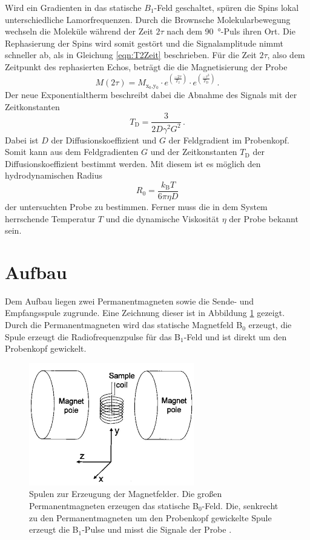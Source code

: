 Wird ein Gradienten in das statische $B_1$-Feld geschaltet, spüren die Spins lokal unterschiedliche Lamorfrequenzen.
Durch die Brownsche Molekularbewegung wechseln die Moleküle während der Zeit $2\tau$ nach dem \SI{90}{\degree}-Puls ihren Ort.
Die Rephasierung der Spins wird somit gestört und die Signalamplitude nimmt schneller ab, als in Gleichung \eqref{eqn:T2Zeit} beschrieben.
Für die Zeit $2\tau$, also dem Zeitpunkt des rephasierten Echos, beträgt die die Magnetisierung der Probe
\begin{equation}
  M(2\tau) = M_\text{x$_0$,y$_0$} \cdot e^{(\frac{-2\tau}{T_2})} \cdot e^{(\frac{-\tau^3}{T_\text{D}})} \, .
  \label{eqn:Diffusion}
\end{equation}
Der neue Exponentialtherm beschreibt dabei die Abnahme des Signals mit der Zeitkonstanten
\begin{equation}
  T_\text{D} = \frac{3}{2D \gamma^2 G^2}\,.
  \label{eqn:TDiffusion}
\end{equation}
Dabei ist $D$ der Diffusionskoeffizient und $G$ der Feldgradient im Probenkopf.
Somit kann aus dem Feldgradienten $G$ und der Zeitkonstanten $T_\text{D}$ der Diffusionskoeffizient bestimmt werden.
Mit diesem ist es möglich den hydrodynamischen Radius
\begin{equation}
  R_0 = \frac{k_\text{B} T}{6 \pi \eta D}
  \label{eqn:stokes}
\end{equation}
 der untersuchten Probe zu bestimmen.
 Ferner muss die in dem System herrschende Temperatur $T$ und die dynamische Viskosität $\eta$ der Probe bekannt sein.


\section{Aufbau}
Dem Aufbau liegen zwei Permanentmagneten sowie die Sende- und Empfangsspule zugrunde.
Eine Zeichnung dieser ist in Abbildung \ref{fig:NMR-Magneten} gezeigt.
Durch die Permanentmagneten wird das statische Magnetfeld B$_0$ erzeugt, die Spule erzeugt die Radiofrequenzpulse für das B$_1$-Feld und ist direkt um den Probenkopf gewickelt.

\begin{figure}[H]
  \centering
  \includegraphics[width = .4\textwidth]{NMR-Magnete.png}
  \caption{Spulen zur Erzeugung der Magnetfelder. Die großen Permanentmagneten erzeugen das statische B$_0$-Feld. Die, senkrecht zu den Permanentmagneten um den Probenkopf gewickelte Spule erzeugt die B$_1$-Pulse und misst die Signale der Probe \cite{Aachen}. }
  \label{fig:NMR-Magneten}
\end{figure}

